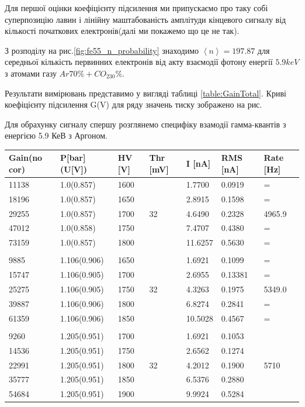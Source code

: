 \documentclass[pdftex,14pt]{scrartcl}
\def\mean#1{\left< #1 \right>}
\begin{document}
\begin{spacing}{1.5}
	Для першої оцінки коефіцієнту підсилення ми припускаємо про таку собі суперпозицію лавин і лінійну маштабованість амплітуди кінцевого сигналу від кількості початкових електронів(далі ми покажемо що це не так).
	
	З розподілу на рис.\ref{fig:fe55_n_probability} знаходимо $\mean{n} = 197.87$ для середньої кількість первинних електронів від акту взаємодії фотону енергії $5.9 keV$ з атомами газу  $Ar70\%+CO_230\%$.
	
	Результати вимірювань представимо у вигляді таблиці \ref{table:GainTotal}. Криві коефіцієнту підсилення G(V) для ряду значень тиску зображено на рис.
	
	Для обрахунку сигналу спершу розглянемо специфіку взамодії гамма-квантів з енергією 5.9 КеВ з Аргоном.
		
	\begin{table}[!h]
	\centering
	\begin{tabular}{|l|l|l|l|l|l|l|}
		\hline
		Gain(no cor) & P[bar] (U[V]) & HV [V] & Thr [mV]&  I [nA] & RMS [nA] & Rate [Hz]  \\
		\hline
		11138 & 1.0(0.857) & 1600 & &  1.7700 & 0.0919 & = \\
		\hline
		18196 & 1.0(0.857) & 1650 & &  2.8915 & 0.1598 & = \\
		\hline
		29255 & 1.0(0.857) & 1700 & 32 & 4.6490 & 0.2328 & 4965.9 \\
		\hline
		47012 & 1.0(0.858) & 1750 & & 7.4707 & 0.4380 & = \\
		\hline
		73159 & 1.0(0.857) & 1800 & & 11.6257 & 0.5630 & = \\
		\hline
		
		& & & & & & \\
		\hline
		
		9885 & 1.106(0.906) & 1650 & & 1.6921 & 0.1099 & = \\
		\hline
		15747 & 1.106(0.905)& 1700 & & 2.6955 & 0.13381 & = \\
		\hline
		25275 & 1.106(0.905)& 1750 & 32 & 4.3263 & 0.1975 & 5349.0 \\
		\hline
		39887 & 1.106(0.906)& 1800 & & 6.8274 & 0.2841 & = \\
		\hline
		61359 & 1.106(0.906)& 1850 & & 10.5028 & 0.4567 & = \\
		\hline
		
		& & & & & & \\
		\hline
		
		9260 & 1.205(0.951) & 1700  & & 1.6921 & 0.1053 & \\
		\hline
		14536 & 1.205(0.951) & 1750 & & 2.6562 & 0.1274 & \\
		\hline
		22991 & 1.205(0.951) & 1800 & 32 & 4.2012 & 0.1900 & 5710 \\
		\hline
		35777 & 1.205(0.951) & 1850 & & 6.5376 & 0.2880 & \\
		\hline
		54684 & 1.205(0.951) & 1900 & & 9.9924 & 0.5284 & \\
		\hline
		

\end{tabular}
\end{table}
\end{spacing}
\end{document}
